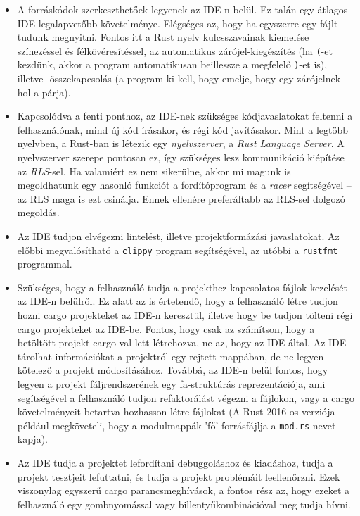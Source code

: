 \begin{itemize}
	\item A forráskódok szerkeszthetőek legyenek az IDE-n belül. Ez talán egy átlagos IDE legalapvetőbb követelménye. 
	Elégséges az, hogy ha egyszerre egy fájlt tudunk megnyitni. 
	Fontos itt a Rust nyelv kulcsszavainak kiemelése színezéssel és félkövéresítéssel, az automatikus zárójel-kiegészítés (ha \texttt{(}-et kezdünk, akkor a program automatikusan beillessze a megfelelő \texttt{)}-et is), 
	illetve -összekapcsolás (a program ki kell, hogy emelje, hogy egy zárójelnek hol a párja).
	
	\item Kapcsolódva a fenti ponthoz, az IDE-nek szükséges kódjavaslatokat feltenni a felhasználónak, mind új kód írásakor, és régi kód javításakor. 
	Mint a legtöbb nyelvben, a Rust-ban is létezik egy \emph{nyelvszerver}, a \emph{Rust Language Server}\cite{rls}. 
	A nyelvszerver szerepe pontosan ez, így szükséges lesz kommunikáció kiépítése az \emph{RLS}-sel. 
	Ha valamiért ez nem sikerülne, akkor mi magunk is megoldhatunk egy hasonló funkciót a fordítóprogram és a \emph{racer}\cite{racer} segítségével -- 
	az RLS maga is ezt csinálja. Ennek ellenére preferáltabb az RLS-sel dolgozó megoldás.\label{rls}
	
	\item Az IDE tudjon elvégezni lintelést, illetve projektformázási javaslatokat. 
	Az előbbi megvalósítható a \texttt{clippy}\cite{clippy} program segítségével, az utóbbi a \texttt{rustfmt}\cite{rustfmt} programmal.
	
	\item Szükséges, hogy a felhasználó tudja a projekthez kapcsolatos fájlok kezelését az IDE-n belülről. 
	Ez alatt az is értetendő, hogy a felhasználó létre tudjon hozni cargo projekteket az IDE-n keresztül, illetve hogy be tudjon tölteni régi cargo projekteket az IDE-be. 
	Fontos, hogy csak az számítson, hogy a betöltött projekt cargo-val lett létrehozva, ne az, hogy az IDE által. 
	Az IDE tárolhat információkat a projektról egy rejtett mappában, de ne legyen kötelező a projekt módosításához. 
	Továbbá, az IDE-n belül fontos, hogy legyen a projekt fáljrendszerének egy fa-struktúrás reprezentációja, ami segítségével a felhasználó tudjon refaktorálást végezni a fájlokon, vagy a cargo követelményeit betartva hozhasson létre fájlokat 
	(A Rust 2016-os verziója például megköveteli, hogy a modulmappák 'fő' forrásfájlja a \texttt{mod.rs} nevet kapja).
	
	\item Az IDE tudja a projektet lefordítani debuggoláshoz és kiadáshoz, tudja a projekt tesztjeit lefuttatni, és tudja a projekt problémáit leellenőrzni. 
	Ezek viszonylag egyszerű cargo parancsmeghívások, a fontos rész az, hogy ezeket a felhasználó egy gombnyomással vagy billentyűkombinációval meg tudja hívni.
	

\end{itemize}
